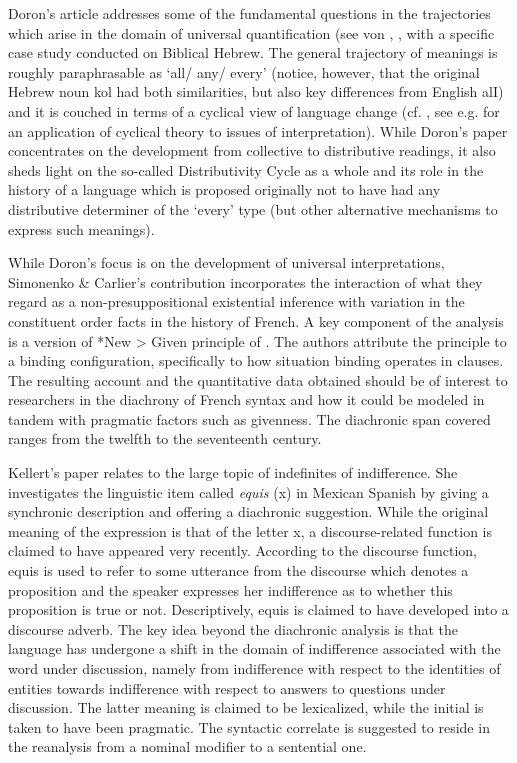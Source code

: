 \documentclass[output=paper]{langsci/langscibook}
\begin{document}
Doron’s article addresses some of the fundamental questions in the trajectories which arise in the domain of universal quantification (see von \citet{Fintel95theformal}, \citet{Haspelmath1995}, \cite{Beck2017} with a specific case study conducted on Biblical Hebrew. The general trajectory of meanings is roughly paraphrasable as ‘all/ any/ every’ (notice, however, that the original Hebrew noun kol had both similarities, but also key differences from English alI) and it is couched in terms of a cyclical view of language change (cf. \citet{vanGelderen2011} , see e.g. \citet{Gergel2016} for an application of cyclical theory to issues of interpretation). While Doron’s paper concentrates on the development from collective to distributive readings, it also sheds light on the so-called Distributivity Cycle as a whole and its role in the history of a language which is proposed originally not to have had any distributive determiner of the ‘every’ type (but other alternative mechanisms to express such meanings).

While Doron’s focus is on the development of universal interpretations, Simonenko \& Carlier’s contribution incorporates the interaction of what they regard as a non-presuppositional existential inference with variation in the constituent order facts in the history of French. A key component of the analysis is a version of *New > Given principle of \citet{Kucerova2012}. The authors attribute the principle to a binding configuration, specifically to how situation binding operates in clauses. The resulting account and the quantitative data obtained should be of interest to researchers in the diachrony of French syntax and how it could be modeled in tandem with pragmatic factors such as givenness. The diachronic span covered ranges from the twelfth to the seventeenth century.

Kellert’s paper relates to the large topic of indefinites of indifference. She investigates the linguistic item called \textit {equis} (x) in Mexican Spanish by giving a synchronic description and offering a diachronic suggestion. While the original meaning of the expression is that of the letter x, a discourse-related function is claimed to have appeared very recently.  According to the discourse function, equis is used to refer to some utterance from the discourse which denotes a proposition and the speaker expresses her indifference as to whether this proposition is true or not. Descriptively, equis is claimed to have developed into a discourse adverb. The key idea beyond the diachronic analysis is that the language has undergone a shift in the domain of indifference associated with the word under discussion, namely from indifference with respect to the identities of entities towards indifference with respect to answers to questions under discussion. The latter meaning is claimed to be lexicalized, while the initial is taken to have been pragmatic. The syntactic correlate is suggested to reside in the reanalysis from a nominal modifier to a sentential one.
\end{document}
